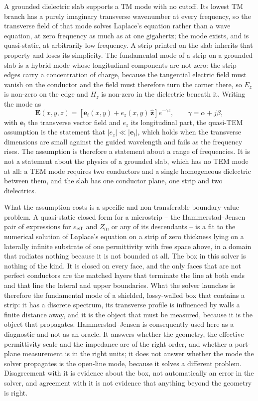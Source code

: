 A grounded dielectric slab supports a TM mode with no cutoff. Its lowest TM branch has a purely imaginary
transverse wavenumber at every frequency, so the transverse field of that mode solves Laplace's equation rather
than a wave equation, at zero frequency as much as at one gigahertz; the mode exists, and is quasi-static, at
arbitrarily low frequency. A strip printed on the slab inherits that property and loses its simplicity. The
fundamental mode of a strip on a grounded slab is a hybrid mode whose longitudinal components are not zero:
the strip edges carry a concentration of charge, because the tangential electric field must vanish on the
conductor and the field must therefore turn the corner there, so $E_z$ is non-zero on the edge and $H_z$ is
non-zero in the dielectric beneath it. Writing the mode as
\begin{equation}
  \mathbf{E}(x,y,z) = \left[\mathbf{e}_t(x,y) + e_z(x,y)\,\hat{\mathbf{z}}\right]e^{-\gamma z},
  \qquad \gamma = \alpha + j\beta,
  \label{eq:ms-hybrid}
\end{equation}
with $\mathbf{e}_t$ the transverse vector field and $e_z$ its longitudinal part, the quasi-TEM assumption is
the statement that $|e_z| \ll |\mathbf{e}_t|$, which holds when the transverse dimensions are small against the
guided wavelength and fails as the frequency rises. The assumption is therefore a statement about a range of
frequencies. It is not a statement about the physics of a grounded slab, which has no TEM mode at all: a TEM
mode requires two conductors and a single homogeneous dielectric between them, and the slab has one conductor
plane, one strip and two dielectrics.

What the assumption costs is a specific and non-transferable boundary-value problem. A quasi-static closed
form for a microstrip -- the Hammerstad--Jensen pair of expressions for $\varepsilon_{\mathrm{eff}}$ and $Z_0$, or any
of its descendants -- is a fit to the numerical solution of Laplace's equation on a strip of zero thickness
lying on a laterally infinite substrate of one permittivity with free space above, in a domain that radiates
nothing because it is not bounded at all. The box in this solver is nothing of the kind. It is closed on every
face, and the only faces that are not perfect conductors are the matched layers that terminate the line at
both ends and that line the lateral and upper boundaries. What the solver launches is therefore the
fundamental mode of a shielded, lossy-walled box that contains a strip: it has a discrete spectrum, its
transverse profile is influenced by walls a finite distance away, and it is the object that must be measured,
because it is the object that propagates. Hammerstad--Jensen is consequently used here as a diagnostic and not
as an oracle. It answers whether the geometry, the effective permittivity scale and the impedance are of the
right order, and whether a port-plane measurement is in the right units; it does not answer whether the mode
the solver propagates is the open-line mode, because it solves a different problem. Disagreement with it is
evidence about the box, not automatically an error in the solver, and agreement with it is not evidence that
anything beyond the geometry is right.

